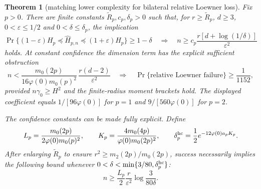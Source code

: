 \documentclass[11pt]{article}
\newtheorem{theorem}{Theorem}[section]
\begin{document}
\begin{theorem}[matching lower complexity for bilateral relative Loewner loss]
\label{thm:matchinglower}
Fix $p>0$.  There are finite constants $\widetilde R_p,c_p,\delta_p>0$ such that, for $r\ge\widetilde R_p$,
$d\ge3$, $0<\varepsilon\le1/2$ and $0<\delta\le\delta_p$, the implication
\begin{equation}
 \Pr\{(1-\varepsilon)H_p\preceq\widehat H_{p,n}\preceq(1+\varepsilon)H_p\}\ge1-\delta
 \quad\Longrightarrow\quad
 n\ge c_p\frac{r[d+\log(1/\delta)]}{\varepsilon^2}
 \label{eq:matchinglower}
\end{equation}
holds.  At constant confidence the dimension term has the explicit sufficient obstruction
\begin{equation}
 n<\frac{m_0(2p)}{16\varphi(0)m_0(p)^2}\,
 \frac{r(d-2)}{\varepsilon^2}
 \quad\Longrightarrow\quad
 \Pr\{\text{relative Loewner failure}\}\ge\frac1{1152},
 \label{eq:explicitlower}
\end{equation}
 provided $n\gamma_0\ge H^2$ and the finite-radius moment brackets hold.  The displayed coefficient equals
 $1/[96\varphi(0)]$ for $p=1$ and $9/[560\varphi(0)]$ for $p=2$.

The confidence constants can be made fully explicit.  Define
\begin{equation}
 L_p=\frac{m_0(2p)}{2\varphi(0)m_0(p)^2},
 \qquad
 K_p=\frac{4m_0(4p)}{\varphi(0)m_0(2p)^2},
 \qquad
 \delta_p^{\rm hc}=\frac12e^{-12\varphi(0)a_pK_p}.
 \label{eq:explicitconfidenceconstants}
\end{equation}
After enlarging $\widetilde R_p$ to ensure $r^2\ge m_2(2p)/m_0(2p)$, success necessarily implies the following
bound whenever $0<\delta<\min\{3/80,\delta_p^{\rm hc}\}$:
\begin{equation}
 n\ge \frac{L_p}{2}\frac r{\varepsilon^2}
 \log\frac{3}{80\delta}.
 \label{eq:explicithighconfidence}
\end{equation}
\end{theorem}
\end{document}
